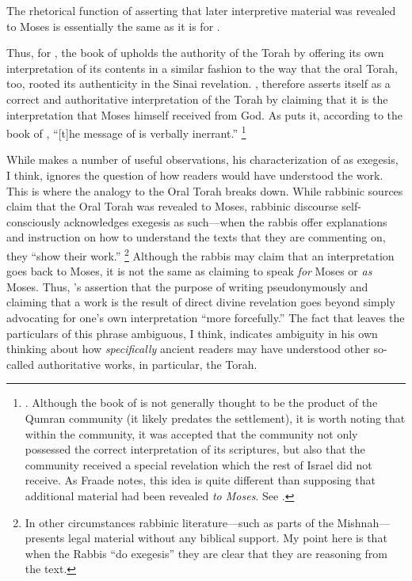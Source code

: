 \noindent
The rhetorical function of asserting that later interpretive material was revealed to Moses is essentially the same as it is for \jub.

Thus, for \vanderkam, the book of \jub upholds the authority of the Torah by offering its own interpretation of its contents in a similar fashion to the way that the oral Torah, too, rooted its authenticity in the Sinai revelation. \jub, therefore asserts itself as a correct and authoritative interpretation of the Torah by claiming that it is the interpretation that Moses himself received from God. As \vanderkam puts it, according to the book of \jub, ``[t]he message of \jub is verbally inerrant.''%
    \footnote{%
        \cite[33]{vanderkam_metso-etal2010}.
        Although the book of \jub is not generally thought to be the product of the Qumran community (it likely predates the settlement), it is worth noting that within the community, it was accepted that the community not only possessed the correct interpretation of its scriptures, but also that the community received a special revelation which the rest of Israel did not receive. As Fraade notes, this idea is quite different than supposing that additional material had been revealed \emph{to Moses}. See 
        \cite[67]{fraade_jjs1993}.}

While \vanderkam makes a number of useful observations, his characterization of \jub as exegesis, I think, ignores the question of how readers would have understood the work. This is where the analogy to the Oral Torah breaks down. While rabbinic sources claim that the Oral Torah was revealed to Moses, rabbinic discourse self-consciously acknowledges exegesis as such---when the rabbis offer explanations and instruction on how to understand the texts that they are commenting on, they ``show their work.''%
    \footnote{%
        In other circumstances rabbinic literature---such as parts of the Mishnah---presents legal material without any biblical support. My point here is that when the Rabbis ``do exegesis'' they are clear that they are reasoning from the text.}
Although the rabbis may claim that an interpretation goes back to Moses, it is not the same as claiming to speak \emph{for} Moses or \emph{as} Moses. Thus, \vanderkam's assertion that the purpose of writing pseudonymously and claiming that a work is the result of direct divine revelation goes beyond simply advocating for one's own interpretation ``more forcefully.'' The fact that \vanderkam leaves the particulars of this phrase ambiguous, I think, indicates ambiguity in his own thinking about how \emph{specifically} ancient readers may have understood \jub \visavis other so-called authoritative works, in particular, the Torah.

